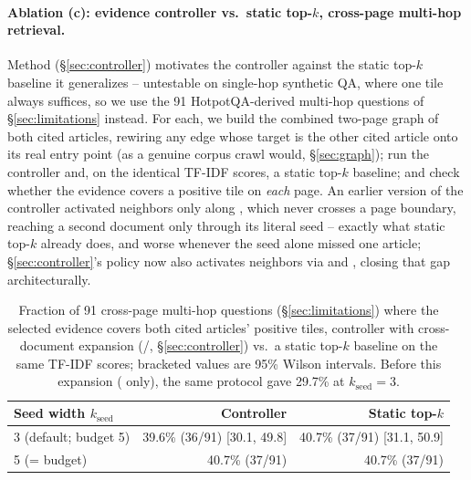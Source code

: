 \paragraph{Ablation (c): evidence controller vs.\ static top-$k$, cross-page multi-hop retrieval.} Method (\S\ref{sec:controller}) motivates the controller against the static top-$k$ baseline it generalizes -- untestable on single-hop synthetic QA, where one tile always suffices, so we use the 91 HotpotQA-derived multi-hop questions of \S\ref{sec:limitations} instead. For each, we build the combined two-page graph of both cited articles, rewiring any  edge whose target is the other cited article onto its real entry point (as a genuine corpus crawl would, \S\ref{sec:graph}); run the controller and, on the identical TF-IDF scores, a static top-$k$ baseline; and check whether the evidence covers a positive tile on \emph{each} page. An earlier version of the controller activated neighbors only along , which never crosses a page boundary, reaching a second document only through its literal seed -- exactly what static top-$k$ already does, and worse whenever the seed alone missed one article; \S\ref{sec:controller}'s policy now also activates neighbors via  and , closing that gap architecturally.

\begin{table}[t]
\centering
\small
\begin{tabular}{@{}lrr@{}}
\toprule
Seed width $k_{\text{seed}}$ & Controller & Static top-$k$ \\
\midrule
3 (default; budget 5) & 39.6\% (36/91) [30.1, 49.8] & 40.7\% (37/91) [31.1, 50.9] \\
5 (= budget) & 40.7\% (37/91) & 40.7\% (37/91) \\
\bottomrule
\end{tabular}
\caption{Fraction of 91 cross-page multi-hop questions (\S\ref{sec:limitations}) where the selected evidence covers both cited articles' positive tiles, controller with cross-document expansion (/, \S\ref{sec:controller}) vs.\ a static top-$k$ baseline on the same TF-IDF scores; bracketed values are 95\% Wilson intervals. Before this expansion ( only), the same protocol gave 29.7\% at $k_{\text{seed}}{=}3$.}
\label{tab:controller-ablation}
\end{table}

